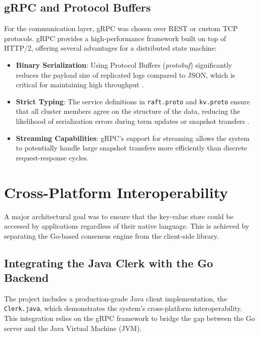 \subsection{gRPC and Protocol Buffers}
For the communication layer, gRPC was chosen over REST or custom TCP protocols. gRPC provides a high-performance framework built on top of HTTP/2, offering several advantages for a distributed state machine:
\begin{itemize}
    \item \textbf{Binary Serialization}: Using Protocol Buffers (\textit{protobuf}) significantly reduces the payload size of replicated logs compared to JSON, which is critical for maintaining high throughput \cite{GoogleProtobuf}.
    \item \textbf{Strict Typing}: The service definitions in \texttt{raft.proto} and \texttt{kv.proto} ensure that all cluster members agree on the structure of the data, reducing the likelihood of serialization errors during term updates or snapshot transfers \cite{10, 11}.
    \item \textbf{Streaming Capabilities}: gRPC's support for streaming allows the system to potentially handle large snapshot transfers more efficiently than discrete request-response cycles.
\end{itemize}

\section{Cross-Platform Interoperability}
A major architectural goal was to ensure that the key-value store could be accessed by applications regardless of their native language. This is achieved by separating the Go-based consensus engine from the client-side library.

\subsection{Integrating the Java Clerk with the Go Backend}
The project includes a production-grade Java client implementation, the \texttt{Clerk.java}, which demonstrates the system's cross-platform interoperability. This integration relies on the gRPC framework to bridge the gap between the Go server and the Java Virtual Machine (JVM).

